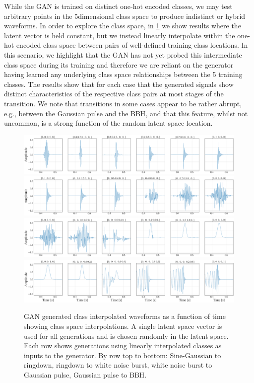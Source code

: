 \documentclass[12pt]{iopart}
\newcommand{\ndimensional}[1]{$#1$\nobreakdash\discretionary{-}{-}{-}dimensional}
\begin{document}
While the \ac{GAN} is trained on distinct one-hot encoded classes, we may test arbitrary points in the \ndimensional{5} class space to produce indistinct or hybrid waveforms. In order to explore the class space, in \cref{fig:c_interp} we show results where the latent vector is held constant, but we instead linearly
interpolate within the one-hot encoded class space between pairs of well-defined training class locations. In this scenario, we highlight that the \ac{GAN} has not yet probed this intermediate class space during its training and therefore we are reliant on the generator having learned any underlying class space relationships between the 5 training classes. The results show that for each case that the generated signals show distinct characteristics of the respective class pairs at most stages of the transition. We note that transitions in some cases appear to be rather abrupt, e.g., between the Gaussian pulse and the \ac{BBH}, and that this feature, whilst not uncommon, is a strong function of the random latent space location. 
%
\begin{figure}[!h]
    \centering
    \includegraphics[width=\textwidth]{figures/generations/sg-rd.png}
    \includegraphics[width=\textwidth]{figures/generations/rd-wnb.png}
    \includegraphics[width=\textwidth]{figures/generations/wnb-blip.png}
    \includegraphics[width=\textwidth]{figures/generations/blip-bbh.png}
    \caption{\ac{GAN} generated class interpolated waveforms as a function of time showing class space interpolations. A single latent space vector is used for all generations and is chosen randomly in the latent space. Each row shows generations using linearly interpolated classes as inputs to the generator. By row top to bottom: Sine-Gaussian to ringdown, ringdown to white noise burst, white noise burst to Gaussian pulse, Gaussian pulse to BBH.}
    \label{fig:c_interp}
\end{figure}
%
\end{document}
